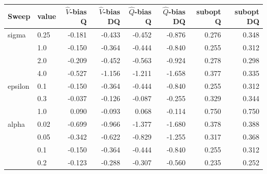 \begin{tabular}{llrrrrrr}\hline
Sweep & value & $\hat V$-bias Q & $\hat V$-bias DQ & $\hat Q$-bias Q & $\hat Q$-bias DQ & subopt Q & subopt DQ \\\hline
sigma & 0.25 & -0.181 & -0.433 & -0.452 & -0.876 & 0.276 & 0.348 \\
 & 1.0 & -0.150 & -0.364 & -0.444 & -0.840 & 0.255 & 0.312 \\
 & 2.0 & -0.209 & -0.452 & -0.563 & -0.924 & 0.278 & 0.298 \\
 & 4.0 & -0.527 & -1.156 & -1.211 & -1.658 & 0.377 & 0.335 \\
\hline
epsilon & 0.1 & -0.150 & -0.364 & -0.444 & -0.840 & 0.255 & 0.312 \\
 & 0.3 & -0.037 & -0.126 & -0.087 & -0.255 & 0.329 & 0.344 \\
 & 1.0 & 0.090 & -0.093 & 0.068 & -0.114 & 0.750 & 0.750 \\
\hline
alpha & 0.02 & -0.699 & -0.966 & -1.377 & -1.680 & 0.378 & 0.388 \\
 & 0.05 & -0.342 & -0.622 & -0.829 & -1.255 & 0.317 & 0.368 \\
 & 0.1 & -0.150 & -0.364 & -0.444 & -0.840 & 0.255 & 0.312 \\
 & 0.2 & -0.123 & -0.288 & -0.307 & -0.560 & 0.235 & 0.252 \\
\hline\end{tabular}
